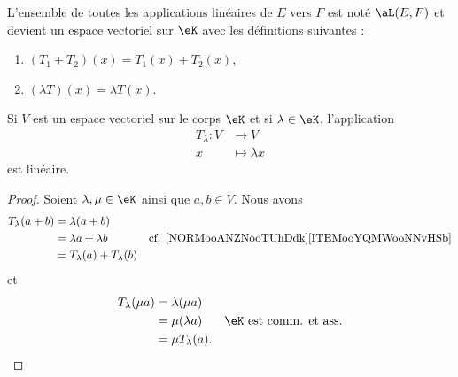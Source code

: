 \begin{lemmaDef} \label{DefDQRooVGbzSm}
	L'ensemble de toutes les applications linéaires de \( E\) vers \( F\) est noté \( \aL(E,F)\) et devient un espace vectoriel sur \( \eK\) avec les définitions suivantes :
	\begin{enumerate}
		\item
		      \( (T_1+T_2)(x)=T_1(x)+T_2(x)\),
		\item
		      \( (\lambda T)(x)=\lambda T(x)\).
	\end{enumerate}
\end{lemmaDef}

\begin{example}     \label{EXooMAWMooEaNWpl}
\end{example}

\begin{proposition}	\label{PROPooEQYBooMYIFKR}
	Si \( V\) est un espace vectoriel sur le corps \( \eK\) et si \( \lambda\in \eK\), l'application
	\begin{equation}
		\begin{aligned}
			T_{\lambda}\colon V & \to V             \\
			x                   & \mapsto \lambda x
		\end{aligned}
	\end{equation}
	est linéaire.
\end{proposition}

\begin{proof}
	Soient \( \lambda,\mu\in \eK\) ainsi que \( a,b\in V\). Nous avons
	\begin{subequations}
		\begin{align}
			T_{\lambda}(a+b) & =\lambda(a+b)                                                                                \\
			                 & =\lambda a+\lambda b           & \text{cf. \ref{NORMooANZNooTUhDdk}\ref{ITEMooYQMWooNNvHSb}} \\
			                 & =T_{\lambda}(a)+T_{\lambda}(b)
		\end{align}
	\end{subequations}
	et
	\begin{subequations}
		\begin{align}
			T_{\lambda}(\mu a) & =\lambda(\mu a)                                          \\
			                   & =\mu (\lambda a)     & \text{\( \eK\) est comm. et ass.} \\
			                   & =\mu T_{\lambda}(a).
		\end{align}
	\end{subequations}
\end{proof}


